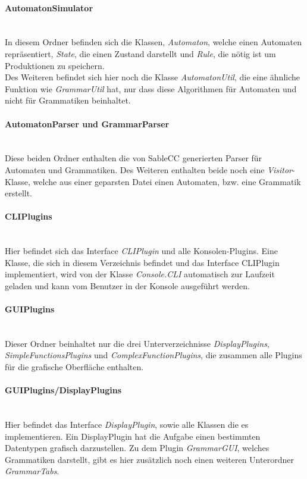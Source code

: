 \paragraph{AutomatonSimulator}\ \\
In diesem Ordner befinden sich die Klassen, \textit{Automaton}, welche einen Automaten repräsentiert, \textit{State}, die einen Zustand darstellt und \textit{Rule}, die nötig ist um Produktionen zu speichern.\\
Des Weiteren befindet sich hier noch die Klasse \textit{AutomatonUtil}, die eine ähnliche Funktion wie \textit{GrammarUtil} hat, nur dass diese Algorithmen für Automaten und nicht für Grammatiken beinhaltet.
\paragraph{AutomatonParser und GrammarParser}\ \\
Diese beiden Ordner enthalten die von SableCC generierten Parser für Automaten und Grammatiken. Des Weiteren enthalten beide noch eine \textit{Visitor}-Klasse, welche aus einer geparsten Datei einen Automaten, bzw. eine Grammatik erstellt.
\paragraph{CLIPlugins}\ \\
Hier befindet sich das Interface \textit{CLIPlugin} und alle Konsolen-Plugins. Eine Klasse, die sich in diesem Verzeichnis befindet und das Interface CLIPlugin implementiert, wird von der Klasse \textit{Console.CLI} automatisch zur Laufzeit geladen und kann vom Benutzer in der Konsole ausgeführt werden.
\paragraph{GUIPlugins}\ \\
Dieser Ordner beinhaltet nur die drei Unterverzeichnisse \textit{DisplayPlugins}, \textit{SimpleFunctionsPlugins} und \textit{ComplexFunctionPlugins}, die zusammen alle Plugins für die grafische Oberfläche enthalten.
\paragraph{GUIPlugins/DisplayPlugins}\ \\
Hier befindet das Interface \textit{DisplayPlugin}, sowie alle Klassen die es implementieren. Ein DisplayPlugin hat die Aufgabe einen bestimmten Datentypen grafisch darzustellen. Zu dem Plugin \textit{GrammarGUI}, welches Grammatiken darstellt, gibt es hier zusätzlich noch einen weiteren Unterordner \textit{GrammarTabs}.

